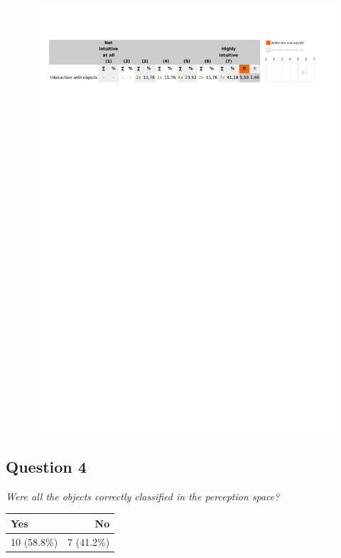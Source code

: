 \begin{figure}[H]
	\centering
	\includegraphics[width=0.6\linewidth]{gfx/Chapter_EvaluationResults/ALFTask/question3}
\end{figure}

\subsection{Question 4}\label{question1:4}
\emph{Were all the objects correctly classified in the perception space?}
\begin{table}[H]
	\begin{center}
		\small \begin{tabular*}{0.35\columnwidth}{lr}
			\\ \hline \hline
			Yes & No \\ \hline \hline

		 	10 (58.8\%) & 7 (41.2\%)\\ \hline
		\end{tabular*}
	\end{center}
\end{table}

